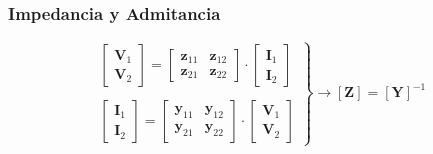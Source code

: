 \subsubsection{Impedancia y Admitancia}
\label{sec:orgf5948b7}
\[
  \left.
    \begin{array}{l}
      \left[
      \begin{array}{c}
        \mathbf{V}_1\\
        \mathbf{V}_2
      \end{array}
      \right] =
      \left[
      \begin{array}{cc}
        \mathbf{z}_{11} & \mathbf{z}_{12}\\
        \mathbf{z}_{21} & \mathbf{z}_{22}
      \end{array}
                          \right]
                          \cdot
                          \left[
                          \begin{array}{c}
                            \mathbf{I}_1\\
                            \mathbf{I}_2
                          \end{array}
      \right] \\ \\
      \left[
      \begin{array}{c}
        \mathbf{I}_1\\
        \mathbf{I}_2
      \end{array}
      \right] =
      \left[
      \begin{array}{cc}
        \mathbf{y}_{11} & \mathbf{y}_{12}\\
        \mathbf{y}_{21} & \mathbf{y}_{22}
      \end{array}
                          \right] \cdot
                          \left[
                          \begin{array}{c}
                            \mathbf{V}_1\\
                            \mathbf{V}_2
                          \end{array}
      \right]
    \end{array}
    \right\}
      \rightarrow
      \boxed{[\mathbf{Z}] = [\mathbf{Y}]^{-1}}
    \]

